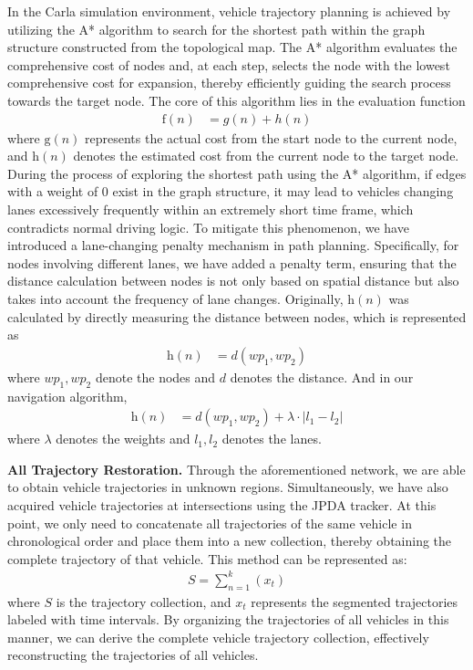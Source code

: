 In the Carla simulation environment, vehicle trajectory planning is achieved by utilizing the A* algorithm to search for the shortest path within the graph structure constructed from the topological map. 
The A* algorithm evaluates the comprehensive cost of nodes and, at each step, selects the node with the lowest comprehensive cost for expansion, thereby efficiently guiding the search process towards the target node. 
The core of this algorithm lies in the evaluation function 
\begin{align}
	\mathrm{f}(n) & = g(n)+h(n)
\end{align}
where $\mathrm{g}(n)$ represents the actual cost from the start node to the current node, and $\mathrm{h}(n)$ denotes the estimated cost from the current node to the target node.
During the process of exploring the shortest path using the A* algorithm, if edges with a weight of 0 exist in the graph structure, it may lead to vehicles changing lanes excessively frequently within an extremely short time frame, which contradicts normal driving logic. 
To mitigate this phenomenon, we have introduced a lane-changing penalty mechanism in path planning. 
Specifically, for nodes involving different lanes, we have added a penalty term, ensuring that the distance calculation between nodes is not only based on spatial distance but also takes into account the frequency of lane changes. 
Originally, $\mathrm{h}(n)$ was calculated by directly measuring the distance between nodes, which is represented as
\begin{align}
	\mathrm{h}(n) & = d\left(w p_{1}, w p_{2}\right)
\end{align}
where $w p_{1}, w p_{2}$ denote the nodes and $d$ denotes the distance. 
And in our navigation algorithm,
\begin{align}
	\mathrm{h}(n) & = d\left(w p_{1}, w p_{2}\right)+\lambda \cdot\left|l_{1}-l_{2}\right|
\end{align}
where $\lambda$ denotes the weights and $l_{1}, l_{2}$ denotes the lanes.


\textbf{All Trajectory Restoration.}
Through the aforementioned network, we are able to obtain vehicle trajectories in unknown regions. 
Simultaneously, we have also acquired vehicle trajectories at intersections using the JPDA tracker. 
At this point, we only need to concatenate all trajectories of the same vehicle in chronological order and place them into a new collection, thereby obtaining the complete trajectory of that vehicle. 
This method can be represented as: 
\begin{align}
	S = \sum_{n = 1}^{k} \left ( x_{t}  \right ) 
\end{align}
where $S$ is the trajectory collection, and $x_{t}$ represents the segmented trajectories labeled with time intervals. 
By organizing the trajectories of all vehicles in this manner, we can derive the complete vehicle trajectory collection, effectively reconstructing the trajectories of all vehicles.

